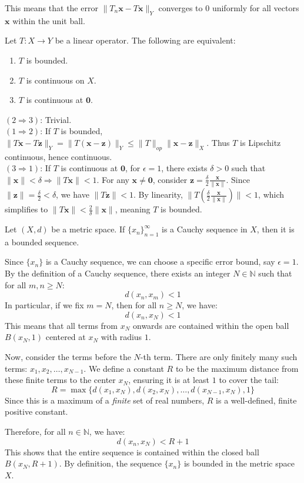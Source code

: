 This means that the error $\|T_n \mathbf{x} - T\mathbf{x}\|_Y$ converges to $0$ uniformly for all vectors $\mathbf{x}$ within the unit ball.


\begin{theorem}
Let $T: X \rightarrow Y$ be a linear operator. The following are equivalent:
\begin{enumerate}
    \item $T$ is bounded.
    \item $T$ is continuous on $X$.
    \item $T$ is continuous at $\mathbf{0}$.
\end{enumerate}
\end{theorem}
\begin{pfbox}
$(2 \Rightarrow 3)$: Trivial.\\
$(1 \Rightarrow 2)$: If $T$ is bounded, $\|T\mathbf{x} - T\mathbf{z}\|_Y = \|T(\mathbf{x}-\mathbf{z})\|_Y \le \|T\|_{op} \|\mathbf{x}-\mathbf{z}\|_X$. Thus $T$ is Lipschitz continuous, hence continuous.\\
$(3 \Rightarrow 1)$: If $T$ is continuous at $\mathbf{0}$, for $\epsilon = 1$, there exists $\delta > 0$ such that $\|\mathbf{x}\| < \delta \Rightarrow \|T\mathbf{x}\| < 1$. For any $\mathbf{x} \ne \mathbf{0}$, consider $\mathbf{z} = \frac{\delta}{2}\frac{\mathbf{x}}{\|\mathbf{x}\|}$. Since $\|\mathbf{z}\| = \frac{\delta}{2} < \delta$, we have $\|T\mathbf{z}\| < 1$. By linearity, $\|T\left(\frac{\delta}{2}\frac{\mathbf{x}}{\|\mathbf{x}\|}\right)\| < 1$, which simplifies to $\|T\mathbf{x}\| < \frac{2}{\delta}\|\mathbf{x}\|$, meaning $T$ is bounded.
\end{pfbox}


\begin{theorem}
Let $(X, d)$ be a metric space. If $\{x_n\}_{n=1}^\infty$ is a Cauchy sequence in $X$, then it is a bounded sequence.
\end{theorem}

\begin{pfbox}
Since $\{x_n\}$ is a Cauchy sequence, we can choose a specific error bound, say $\epsilon = 1$. 
By the definition of a Cauchy sequence, there exists an integer $N \in \mathbb{N}$ such that for all $m, n \ge N$:
\[ d(x_n, x_m) < 1 \]
In particular, if we fix $m = N$, then for all $n \ge N$, we have:
\[ d(x_n, x_N) < 1 \]
This means that all terms from $x_N$ onwards are contained within the open ball $B(x_N, 1)$ centered at $x_N$ with radius $1$.

Now, consider the terms before the $N$-th term. There are only finitely many such terms: $x_1, x_2, \dots, x_{N-1}$. 
We define a constant $R$ to be the maximum distance from these finite terms to the center $x_N$, ensuring it is at least $1$ to cover the tail:
\[ R = \max \{ d(x_1, x_N), d(x_2, x_N), \dots, d(x_{N-1}, x_N), 1 \} \]
Since this is a maximum of a \textit{finite} set of real numbers, $R$ is a well-defined, finite positive constant.

Therefore, for all $n \in \mathbb{N}$, we have:
\[ d(x_n, x_N) < R+1 \]
This shows that the entire sequence is contained within the closed ball $B(x_N, R+1)$. By definition, the sequence $\{x_n\}$ is bounded in the metric space $X$.
\end{pfbox}


